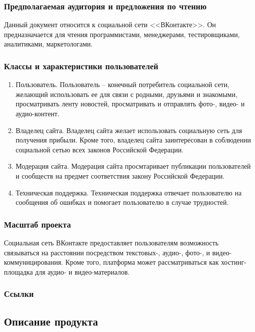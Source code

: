 \subsubsection{Предполагаемая аудитория и предложения по чтению}
Данный документ относится к социальной сети <<ВКонтакте>>.
Он предназначается для чтения программистами, менеджерами, тестировщиками, аналитиками, маркетологами.

\subsubsection{Классы и характеристики пользователей}
\begin{enumerate}
  \item Пользователь. Пользователь -- конечный потребитель социальной
    сети, желающий использовать ее для связи с родными, друзьями и знакомыми, просматривать ленту новостей, просматривать и отправлять фото-, видео- и аудио-контент.
  \item Владелец сайта. Владелец сайта желает использовать социальную сеть
  для получения прибыли. Кроме того, владелец сайта заинтересован в соблюдении
    социальной сетью всех законов Российской Федерации.
  \item Модерация сайта.
    Модерация сайта просмтаривает публикации пользователей и сообществ на предмет
    соответствия закону Российской Федерации.
  \item Техническая поддержка.
    Техническая поддержка отвечает пользователю на сообщения об ошибках и
    помогает пользователю в случае трудностей.
\end{enumerate}

\subsubsection{Масштаб проекта}
Социальная сеть ВКонтакте предоставляет пользователям возможность связываться на расстоянии посредством текстовых-, аудио-, фото-, и видео-коммуницирования.
Кроме того, платформа может рассматриваться как хостинг-площадка для аудио- и видео-материалов.

\subsubsection{Ссылки}

\subsection{Описание продукта}

